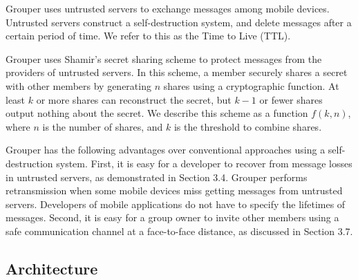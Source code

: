 \documentclass[sigconf]{acmart}
\begin{document}
Grouper uses untrusted servers to exchange messages among mobile devices.
Untrusted servers construct a self-destruction system, and delete messages after a certain period of time.
We refer to this as the Time to Live (TTL).

Grouper uses Shamir's secret sharing scheme to protect messages from the providers of untrusted servers.
In this scheme, a member securely shares a secret with other members by generating $n$ shares using a cryptographic function\cite{smith2013layered}. 
At least $k$ or more shares can reconstruct the secret, but $k-1$ or fewer shares output nothing about the secret\cite{pang2005new}. 
We describe this scheme as a function ${f(k, n)}$, where $n$ is the number of shares, and $k$ is the threshold to combine shares. 

Grouper has the following advantages over conventional approaches using a self-destruction system.
First, it is easy for a developer to recover from message losses in untrusted servers, as demonstrated in Section 3.4.
Grouper performs retransmission when some mobile devices miss getting messages from untrusted servers.
Developers of mobile applications do not have to specify the lifetimes of messages.
Second, it is easy for a group owner to invite other members using a safe communication channel at a face-to-face distance, as discussed in Section 3.7.

\subsection{Architecture}
\end{document}
